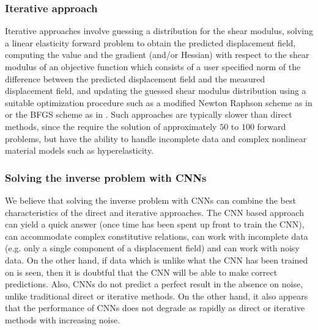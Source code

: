 \documentclass[12pt]{article}
\begin{document}
\subsubsection{Iterative approach} Iterative approaches \cite{paper:oberai2003,paper:gokhale2008,paper:kalle1996,paper:doyley,paper:goenezen2011} involve guessing a distribution for the shear modulus, solving a linear elasticity forward problem to obtain the predicted displacement field, computing the value and the gradient (and/or Hessian) with respect to the shear modulus of an objective function which consists of a user specified norm of the difference between the predicted displacement field and the measured displacement field, and updating the guessed shear modulus distribution using a suitable optimization procedure such as a modified Newton Raphson scheme as in \cite{paper:doyley} or the BFGS scheme as in \cite{paper:gokhale2008,paper:goenezen2011}. Such approaches are typically slower than direct methods, since the require the solution of approximately $50$ to $100$ forward problems, but have the ability to handle incomplete data and complex nonlinear material models such as hyperelasticity.
\subsubsection{Solving the inverse problem with CNNs}
We believe that solving the inverse problem with CNNs can combine the best characteristics of the direct and iterative approaches. The CNN based approach can yield a quick answer (once time has been spent up front to train the CNN), can accommodate complex constitutive relations, can work with incomplete data (e.g. only a single component of a displacement field) and can work with noisy data. On the other hand, if data which is unlike what the CNN has been trained on is seen, then it is doubtful that the CNN will be able to make correct predictions. Also, CNNs do not predict a perfect result in the absence on noise, unlike traditional direct or iterative methods. On the other hand, it also appears that the performance of CNNs does not degrade as rapidly as direct or iterative methods with increasing noise.
\end{document}
